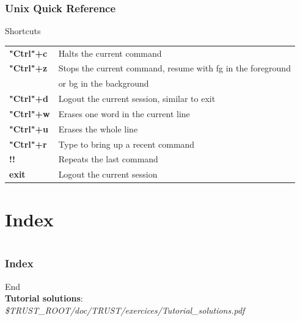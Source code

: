 \documentclass[10pt, hyperref={unicode=true,pdfusetitle, bookmarks=true,bookmarksnumbered=false,bookmarksopen=false, breaklinks=false,pdfborder={0 0 1},backref=true,colorlinks=true,linkcolor=darkblue,pageanchor}]{beamer}
\begin{document}
\begin{frame}
\frametitle{Unix Quick Reference}
\begin{block}{Shortcuts}

\begin{tabular}{ll}
\textbf{"Ctrl"+c} & Halts the current command                                     \tabularnewline
\textbf{"Ctrl"+z} & Stops the current command, resume with fg in the foreground   \tabularnewline
                & or bg in the background                                       \tabularnewline
\textbf{"Ctrl"+d} & Logout the current session, similar to exit                   \tabularnewline
\textbf{"Ctrl"+w} & Erases one word in the current line                           \tabularnewline
\textbf{"Ctrl"+u} & Erases the whole line                                         \tabularnewline
\textbf{"Ctrl"+r} & Type to bring up a recent command                             \tabularnewline
\textbf{!!}     & Repeats the last command                                      \tabularnewline
\textbf{exit}   & Logout the current session                                    \tabularnewline
\end{tabular}

\end{block}
\end{frame}


\section{{\bf{Index}}}
\begin{frame}
\begin{columns}[c] 
\tableofcontents[sections={1-9},currentsection, currentsubsection]
\tableofcontents[sections={10-16},currentsection, currentsubsection]
\end{columns}
\end{frame}
\begin{frame}[allowframebreaks]
\frametitle{Index}
\printindex
\end{frame}


\begin{frame}
\begin{center}
{\Huge{End}}\\
\vspace{2cm}
\textbf{Tutorial solutions}: \textit{\$TRUST\_ROOT/doc/TRUST/exercices/Tutorial\_solutions.pdf}
\end{center}
\end{frame}
\end{document}
